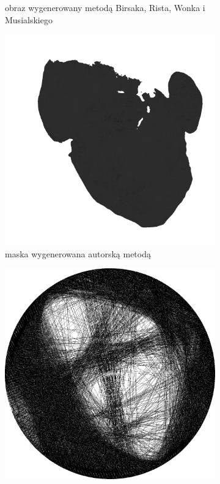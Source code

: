 \documentclass[a4paper, 12pt, polish, twoside]{extreport}
\begin{document}
\begin{figure}[H]
\begin{subfigure}{0.32\textwidth}
        \caption{obraz wygenerowany metodą Birsaka, Rista, Wonka i Musialskiego}
        \label{comp-comp-magdalene-c}
    \end{subfigure}
    \begin{subfigure}{0.24\textwidth}
        \centering
        \includegraphics[width = \textwidth]{img/6-comp/magdalene_mask_c20_inv0_bg1_obj10_ed1.png}
        \caption{maska wygenerowana autorską metodą}
        \label{comp-comp-magdalene-d}
    \end{subfigure}
    \begin{subfigure}{0.24\textwidth}
        \centering
        \includegraphics[width = \textwidth]{img/6-comp/magdalene_e_i3500_c20_inv0_bg1_obj10_ed1.png}

\end{subfigure}
\end{figure}
\end{document}

